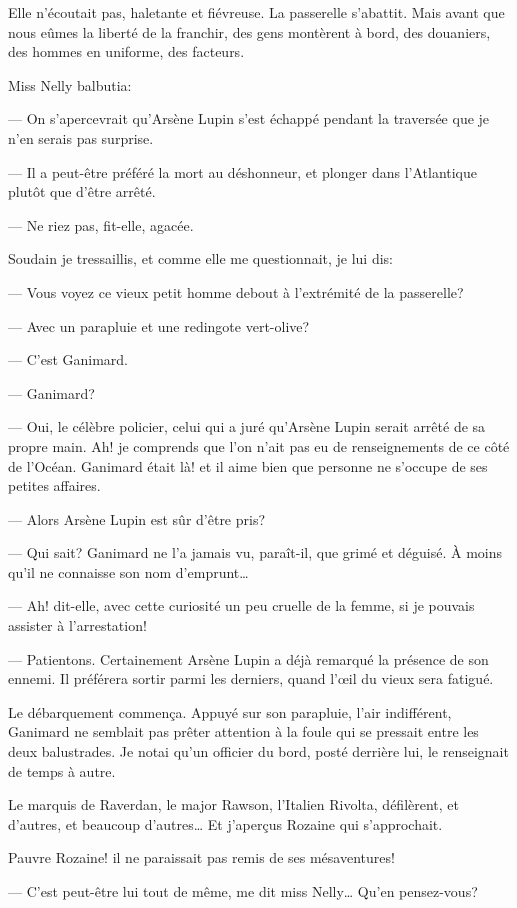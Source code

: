 \documentclass[12pt,a4paper]{book}
\begin{document}
Elle n’écoutait pas, haletante et fiévreuse. La passerelle s’abattit. Mais avant que nous eûmes la liberté de la franchir, des gens montèrent à bord, des douaniers, des hommes en uniforme, des facteurs. 

Miss Nelly balbutia:

— On s’apercevrait qu’Arsène Lupin s’est échappé pendant la traversée que je n’en serais pas surprise.

— Il a peut-être préféré la mort au déshonneur, et plonger dans l’Atlantique plutôt que d’être arrêté.

— Ne riez pas, fit-elle, agacée.

Soudain je tressaillis, et comme elle me questionnait, je lui dis:

— Vous voyez ce vieux petit homme debout à l’extrémité de la passerelle?

— Avec un parapluie et une redingote vert-olive?

— C’est Ganimard.

— Ganimard?

— Oui, le célèbre policier, celui qui a juré qu’Arsène Lupin serait arrêté de sa propre main. Ah! je comprends que l’on n’ait pas eu de renseignements de ce côté de l’Océan. Ganimard était là! et il aime bien que personne ne s’occupe de ses petites affaires.

— Alors Arsène Lupin est sûr d’être pris?

— Qui sait? Ganimard ne l’a jamais vu, paraît-il, que grimé et déguisé. À moins qu’il ne connaisse son nom d’emprunt…

— Ah! dit-elle, avec cette curiosité un peu cruelle de la femme, si je pouvais assister à l’arrestation! 

— Patientons. Certainement Arsène Lupin a déjà remarqué la présence de son ennemi. Il préférera sortir parmi les derniers, quand l’œil du vieux sera fatigué.

Le débarquement commença. Appuyé sur son parapluie, l’air indifférent, Ganimard ne semblait pas prêter attention à la foule qui se pressait entre les deux balustrades. Je notai qu’un officier du bord, posté derrière lui, le renseignait de temps à autre.

Le marquis de Raverdan, le major Rawson, l’Italien Rivolta, défilèrent, et d’autres, et beaucoup d’autres… Et j’aperçus Rozaine qui s’approchait.

Pauvre Rozaine! il ne paraissait pas remis de ses mésaventures!

— C’est peut-être lui tout de même, me dit miss Nelly… Qu’en pensez-vous?
\end{document}
